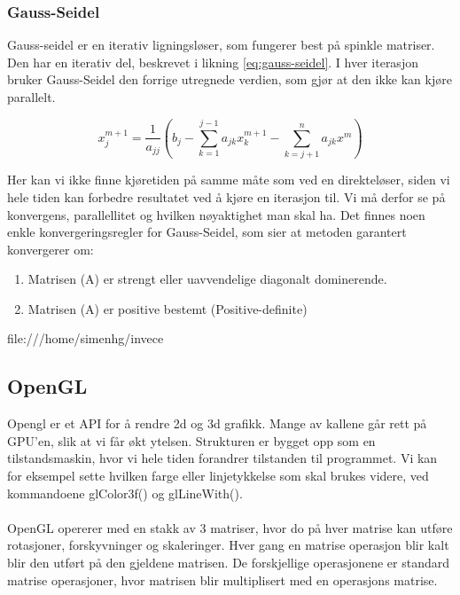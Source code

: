 \documentclass[10pt,a4paper, norsk]{article}
\begin{document}
\subsubsection{Gauss-Seidel}
Gauss-seidel er en iterativ ligningsløser, som fungerer best på spinkle matriser. Den har en iterativ del, beskrevet i likning \ref{eq:gauss-seidel}. I hver iterasjon bruker Gauss-Seidel  den forrige utregnede verdien, som gjør at den ikke kan kjøre parallelt. 
 
 \begin{equation} \label{seideliterater}
   x_j^{m+1} = \frac{1}{a_{jj}}  (b_j - \sum_{k=1}^{j-1} a_{jk} x_k^{m+1} - \sum_{k=j+1}^n a_{jk}x^m)
 \end{equation}

Her kan vi ikke finne kjøretiden på samme måte som ved en direkteløser, siden vi hele tiden kan forbedre resultatet ved å kjøre en iterasjon til. Vi må derfor se på konvergens, parallellitet og hvilken nøyaktighet man skal ha. Det finnes noen enkle konvergeringsregler for Gauss-Seidel, som sier at metoden garantert konvergerer om:
\begin{enumerate}
\item Matrisen (A) er strengt eller uavvendelige diagonalt dominerende.
\item Matrisen (A) er positive bestemt (Positive-definite)
\end{enumerate}file:///home/simenhg/invece%



\subsection{OpenGL}
Opengl er et API for å rendre 2d og 3d grafikk. Mange av kallene går rett på GPU'en, slik at vi får økt ytelsen. Strukturen er bygget opp som en tilstandsmaskin, hvor vi hele tiden forandrer tilstanden til programmet. Vi kan for eksempel sette hvilken farge eller linjetykkelse som skal brukes videre, ved kommandoene glColor3f() og glLineWith().

\paragraph{}
OpenGL opererer med en stakk av 3 matriser, hvor do på hver matrise kan utføre rotasjoner, forskyvninger og skaleringer. Hver gang en matrise operasjon blir kalt blir den utført på den gjeldene matrisen. De forskjellige operasjonene er standard matrise operasjoner, hvor matrisen blir multiplisert med en operasjons matrise.
\end{document}
